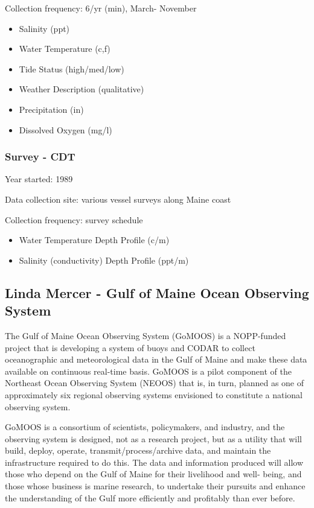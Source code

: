 Collection frequency: 6/yr (min), March- November

\begin{itemize}
\item Salinity (ppt)
\item Water Temperature (c,f)
\item Tide Status (high/med/low)
\item Weather Description (qualitative)
\item Precipitation (in)
\item Dissolved Oxygen (mg/l)
\end{itemize}

\subsubsection{Survey - CDT}

Year started: 1989

Data collection site: various vessel surveys along Maine coast

Collection frequency: survey schedule

\begin{itemize}
\item Water Temperature Depth Profile (c/m)
\item Salinity (conductivity) Depth Profile (ppt/m)     
\end{itemize}


\subsection{Linda Mercer - Gulf of Maine Ocean Observing System}

The Gulf of Maine Ocean Observing System (GoMOOS) is a NOPP-funded
project that is developing a system of buoys and CODAR to collect
oceanographic and meteorological data in the Gulf of Maine and make
these data available on continuous real-time basis.  GoMOOS is a pilot
component of the Northeast Ocean Observing System (NEOOS) that is, in
turn, planned as one of approximately six regional observing systems
envisioned to constitute a national observing system.  

GoMOOS is a consortium of scientists, policymakers, and industry, and
the observing system is designed, not as a research project, but as a
utility that will build, deploy, operate, transmit/process/archive
data, and maintain the infrastructure required to do this.  The data
and information produced will allow those who depend on the Gulf of
Maine for their livelihood and well- being, and those whose business
is marine research, to undertake their pursuits and enhance the
understanding of the Gulf more efficiently and profitably than ever
before.

